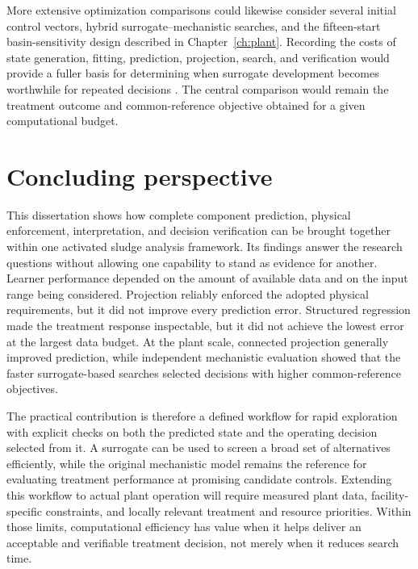 More extensive optimization comparisons could likewise consider several initial control vectors, hybrid surrogate--mechanistic searches, and the fifteen-start basin-sensitivity design described in Chapter~\ref{ch:plant}. Recording the costs of state generation, fitting, prediction, projection, search, and verification would provide a fuller basis for determining when surrogate development becomes worthwhile for repeated decisions \citep{BhosekarIerapetritou2018,Bliek2023}. The central comparison would remain the treatment outcome and common-reference objective obtained for a given computational budget.

\section{Concluding perspective}

This dissertation shows how complete component prediction, physical enforcement, interpretation, and decision verification can be brought together within one activated sludge analysis framework. Its findings answer the research questions without allowing one capability to stand as evidence for another. Learner performance depended on the amount of available data and on the input range being considered. Projection reliably enforced the adopted physical requirements, but it did not improve every prediction error. Structured regression made the treatment response inspectable, but it did not achieve the lowest error at the largest data budget. At the plant scale, connected projection generally improved prediction, while independent mechanistic evaluation showed that the faster surrogate-based searches selected decisions with higher common-reference objectives.

The practical contribution is therefore a defined workflow for rapid exploration with explicit checks on both the predicted state and the operating decision selected from it. A surrogate can be used to screen a broad set of alternatives efficiently, while the original mechanistic model remains the reference for evaluating treatment performance at promising candidate controls. Extending this workflow to actual plant operation will require measured plant data, facility-specific constraints, and locally relevant treatment and resource priorities. Within those limits, computational efficiency has value when it helps deliver an acceptable and verifiable treatment decision, not merely when it reduces search time.